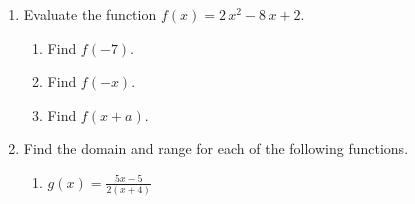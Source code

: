 \documentclass[11pt]{article}
\begin{document}
\begin{enumerate}

% 

\item %
\providecommand{\stxKnowl}{}\renewcommand{\stxKnowl}[1]{#1}
\providecommand{\stxOuttro}{}\renewcommand{\stxOuttro}[1]{#1}
\providecommand{\stxTitle}{}\renewcommand{\stxTitle}[1]{#1}
\renewcommand{\stxOuttro}[1]{}
\stxKnowl{
Evaluate the function \(f(x) = 2 \, x^{2} - 8 \, x + 2\).

\begin{enumerate}
\item
\stxKnowl{
Find \(f(-7)\).

\stxOuttro{
SOLUTION

\(2(-7)^2 - 8(-7) + 2\)

\(\boxed{f(-7) = 156}\)

}
}

\item
\stxKnowl{
Find \(f(-x)\).

\stxOuttro{
SOLUTION

\(2(-x)^2 - 8(-x) + 2\)

\(\boxed{f(-x) = 2 \, x^{2} + 8 \, x + 2}\)

}
}

\item
\stxKnowl{
Find \(f(x + a)\).

\stxOuttro{
SOLUTION

\(2(x+a)^2 - 8(x+a) + 2\)

\(\boxed{f(x + a) = 2 \, a^{2} + 4 \, a x + 2 \, x^{2} - 8 \, a - 8 \, x + 2}\)

}
}

\end{enumerate}
}

\newpage

% 

\item %
\providecommand{\stxKnowl}{}\renewcommand{\stxKnowl}[1]{#1}
\providecommand{\stxOuttro}{}\renewcommand{\stxOuttro}[1]{#1}
\providecommand{\stxTitle}{}\renewcommand{\stxTitle}[1]{#1}
\renewcommand{\stxOuttro}[1]{}
\stxKnowl{
Find the domain and range for each of the following functions.

\begin{enumerate}
\item
\stxKnowl{
\(g(x) = \displaystyle \frac{5x - 5}{2(x + 4)}\)

}
\end{enumerate}}
\end{enumerate}
\end{document}
